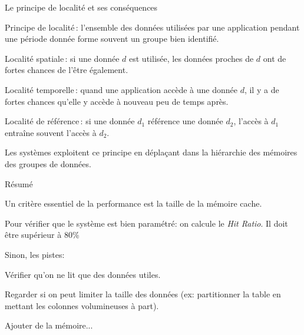 \begin{frame}{Le principe de localité et ses conséquences}


\alert{Principe de localité}\,: l'ensemble des  données utilisées
par une application pendant une période donnée forme souvent
un groupe bien identifié.


\begin{redbullet}
 \item \alert{Localité spatiale}\,: si une donnée $d$ est utilisée,
    les données proches de $d$ ont de fortes chances de l'être
    également.

 \item \alert{Localité temporelle}\,: quand une application accède
   à une donnée $d$, il y a de fortes chances qu'elle y accède à nouveau
   peu de temps après.

 \item \alert{Localité de référence}\,: si une donnée $d_1$ référence
     une donnée $d_2$, l'accès à $d_1$ entraîne souvent
    l'accès à $d_2$.
\end{redbullet}

\begin{blocgauche}
Les systèmes exploitent ce principe 
en déplaçant dans la hiérarchie des mémoires des groupes
de données.
\end{blocgauche}

\end{frame}

\begin{frame}{Résumé}

Un critère essentiel de la performance est la taille de la mémoire cache.

\vfill 

Pour vérifier que le système est bien paramétré: on calcule le \textit{Hit Ratio}. Il doit être supérieur à 80\%

\vfill

Sinon, les pistes:

\vfill
\begin{blocgauche}
\begin{redbullet}
  \item Vérifier qu'on ne lit que des données utiles.
  \item Regarder si on peut limiter la taille des données (ex: partitionner la table
       en mettant les colonnes volumineuses à part).
   \item Ajouter de la mémoire...
\end{redbullet}
\end{blocgauche}

\end{frame}
